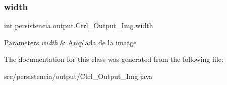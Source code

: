 \subsubsection{\texorpdfstring{width}{width}}
{\footnotesize\ttfamily int persistencia.\+output.\+Ctrl\+\_\+\+Output\+\_\+\+Img.\+width\hspace{0.3cm}{\ttfamily [package]}}


\begin{DoxyParams}{Parameters}
{\em width} & Amplada de la imatge \\
\hline
\end{DoxyParams}


The documentation for this class was generated from the following file\+:\begin{DoxyCompactItemize}
\item 
src/persistencia/output/Ctrl\+\_\+\+Output\+\_\+\+Img.\+java\end{DoxyCompactItemize}
